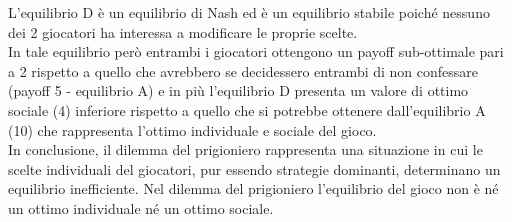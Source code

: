 L'equilibrio D è un equilibrio di Nash ed è un equilibrio stabile poiché nessuno dei 2 giocatori ha interessa a modificare le proprie scelte.\\

In tale equilibrio però entrambi i giocatori ottengono un payoff sub-ottimale pari a 2 rispetto a quello che avrebbero se decidessero entrambi di non confessare (payoff 5 - equilibrio A) e in più l'equilibrio D presenta un valore di ottimo sociale (4) inferiore rispetto a quello che si potrebbe ottenere dall'equilibrio A (10) che rappresenta l'ottimo individuale e sociale del gioco.\\

In conclusione, il dilemma del prigioniero rappresenta una situazione in cui le scelte individuali del giocatori, pur essendo strategie dominanti, determinano un equilibrio inefficiente. Nel dilemma del prigioniero l'equilibrio del gioco non è né un ottimo individuale né un ottimo sociale.\\
